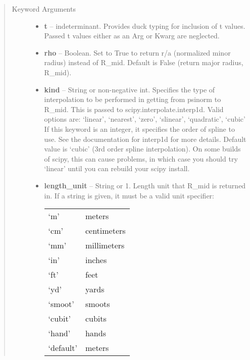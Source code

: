 \documentclass[letterpaper,10pt,english]{sphinxmanual}
\begin{document}
\begin{fulllineitems}
\begin{fulllineitems}
\begin{quote}
\begin{description}
\item[{Keyword Arguments}] \leavevmode\begin{itemize}
\item {} 
\textbf{t} --
indeterminant.
Provides duck typing for inclusion of t values. Passed t values
either as an Arg or Kwarg are neglected.

\item {} 
\textbf{rho} --
Boolean.
Set to True to return r/a (normalized minor radius)
instead of R\_mid. Default is False (return major radius, R\_mid).

\item {} 
\textbf{kind} --
String or non-negative int.
Specifies the type of interpolation
to be performed in getting from psinorm to R\_mid. This is
passed to scipy.interpolate.interp1d. Valid options are:
`linear', `nearest', `zero', `slinear', `quadratic', `cubic'
If this keyword is an integer, it specifies the order of spline
to use. See the documentation for interp1d for more details.
Default value is `cubic' (3rd order spline interpolation). On
some builds of scipy, this can cause problems, in which case
you should try `linear' until you can rebuild your scipy install.

\item {} 
\textbf{length\_unit} --
String or 1.
Length unit that R\_mid is returned in. If
a string is given, it must be a valid unit specifier:

\begin{tabulary}{\linewidth}{|L|L|}
\hline

`m'
 & 
meters
\\

`cm'
 & 
centimeters
\\

`mm'
 & 
millimeters
\\

`in'
 & 
inches
\\

`ft'
 & 
feet
\\

`yd'
 & 
yards
\\

`smoot'
 & 
smoots
\\

`cubit'
 & 
cubits
\\

`hand'
 & 
hands
\\

`default'
 & 
meters
\\
\hline\end{tabulary}



\end{itemize}
\end{description}
\end{quote}
\end{fulllineitems}
\end{fulllineitems}
\end{document}
